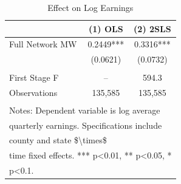 \begin{table}[!h]
\centering
\caption{\label{tab:earnings}Effect on Log Earnings}
\centering
\begin{tabular}[t]{lcc}
\toprule
  & (1) OLS & (2) 2SLS\\
\midrule
Full Network MW & 0.2449*** & 0.3316***\\
 & (0.0621) & (0.0732)\\
 &  & \\
First Stage F & -- & 594.3\\
Observations & 135,585 & 135,585\\
\bottomrule
\multicolumn{3}{l}{\textsuperscript{} Notes: Dependent variable is log average}\\
\multicolumn{3}{l}{quarterly earnings. Specifications include}\\
\multicolumn{3}{l}{county and state \$\textbackslash{}times\$}\\
\multicolumn{3}{l}{time fixed effects. *** p<0.01, ** p<0.05, *}\\
\multicolumn{3}{l}{p<0.1.}\\
\end{tabular}
\end{table}
